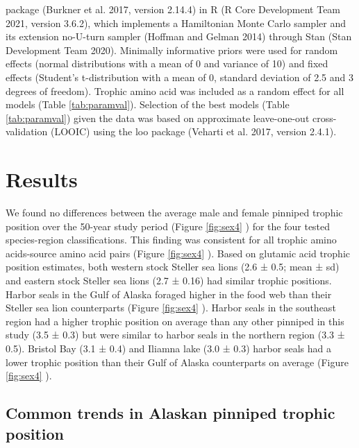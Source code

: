 \documentclass [11pt, proquest] {uwthesis}[2015/03/03]
\begin{document}
package (Burkner et al. 2017, version 2.14.4) in R (R Core Development
Team 2021, version 3.6.2), which implements a Hamiltonian Monte Carlo
sampler and its extension no-U-turn sampler (Hoffman and Gelman 2014)
through Stan (Stan Development Team 2020). Minimally informative priors
were used for random effects (normal distributions with a mean of 0 and
variance of 10) and fixed effects (Student's t-distribution with a mean
of 0, standard deviation of 2.5 and 3 degrees of freedom). Trophic amino
acid was included as a random effect for all models (Table
\ref{tab:paramval}). Selection of the best models (Table
\ref{tab:paramval}) given the data was based on approximate
leave-one-out cross-validation (LOOIC) using the loo package (Veharti et
al. 2017, version 2.4.1).

\section{Results}\label{results-2}

We found no differences between the average male and female pinniped
trophic position over the 50-year study period (Figure \ref{fig:sex4} )
for the four tested species-region classifications. This finding was
consistent for all trophic amino acids-source amino acid pairs (Figure
\ref{fig:sex4} ). Based on glutamic acid trophic position estimates,
both western stock Steller sea lions (2.6 ± 0.5; mean ± sd) and eastern
stock Steller sea lions (2.7 ± 0.16) had similar trophic positions.
Harbor seals in the Gulf of Alaska foraged higher in the food web than
their Steller sea lion counterparts (Figure \ref{fig:sex4} ). Harbor
seals in the southeast region had a higher trophic position on average
than any other pinniped in this study (3.5 ± 0.3) but were similar to
harbor seals in the northern region (3.3 ± 0.5). Bristol Bay (3.1 ± 0.4)
and Iliamna lake (3.0 ± 0.3) harbor seals had a lower trophic position
than their Gulf of Alaska counterparts on average (Figure \ref{fig:sex4}
).

\subsection{Common trends in Alaskan pinniped trophic
position}\label{common-trends-in-alaskan-pinniped-trophic-position}
\end{document}
